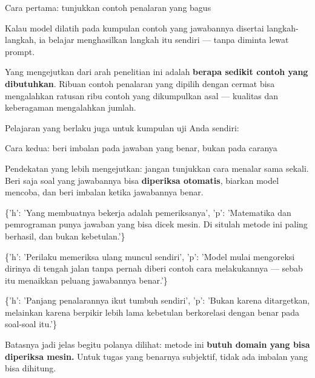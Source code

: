 \documentclass[aspectratio=169,11pt,t]{beamer}
\begin{document}
\begin{frame}[shrink=25]{Cara pertama: tunjukkan contoh penalaran yang bagus}
{\fontsize{9.4}{12.6}\selectfont\color{fg2}Kalau model dilatih pada kumpulan contoh yang jawabannya disertai langkah-langkah, ia belajar menghasilkan langkah itu sendiri --- tanpa diminta lewat prompt.\par}\vskip 4pt
{\fontsize{9.4}{12.6}\selectfont\color{fg2}Yang mengejutkan dari arah penelitian ini adalah \textbf{berapa sedikit contoh yang dibutuhkan}. Ribuan contoh penalaran yang dipilih dengan cermat bisa mengalahkan ratusan ribu contoh yang dikumpulkan asal --- kualitas dan keberagaman mengalahkan jumlah.\par}\vskip 4pt
\begin{iband}[signal]
Pelajaran yang berlaku juga untuk kumpulan uji Anda sendiri: 
\end{iband}
\end{frame}

\begin{frame}[shrink=25]{Cara kedua: beri imbalan pada jawaban yang benar, bukan pada caranya}
{\fontsize{9.4}{12.6}\selectfont\color{fg2}Pendekatan yang lebih mengejutkan: jangan tunjukkan cara menalar sama sekali. Beri saja soal yang jawabannya bisa \textbf{diperiksa otomatis}, biarkan model mencoba, dan beri imbalan ketika jawabannya benar.\par}\vskip 4pt
\begin{isteps}
\item \{'h': 'Yang membuatnya bekerja adalah pemeriksanya', 'p': 'Matematika dan pemrograman punya jawaban yang bisa dicek mesin. Di situlah metode ini paling berhasil, dan bukan kebetulan.'\}
\item \{'h': 'Perilaku memeriksa ulang muncul sendiri', 'p': 'Model mulai mengoreksi dirinya di tengah jalan tanpa pernah diberi contoh cara melakukannya --- sebab itu menaikkan peluang jawabannya benar.'\}
\item \{'h': 'Panjang penalarannya ikut tumbuh sendiri', 'p': 'Bukan karena ditargetkan, melainkan karena berpikir lebih lama kebetulan berkorelasi dengan benar pada soal-soal itu.'\}
\end{isteps}
\begin{iband}[signal]
Batasnya jadi jelas begitu polanya dilihat: metode ini \textbf{butuh domain yang bisa diperiksa mesin.} Untuk tugas yang benarnya subjektif, tidak ada imbalan yang bisa dihitung.
\end{iband}
\end{frame}
\end{document}
